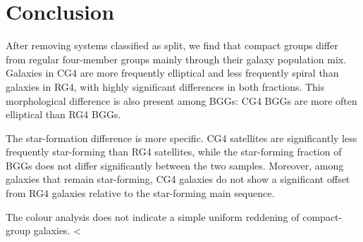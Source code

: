\documentclass{aa}
\begin{document}
\section{Conclusion}

After removing systems classified as split, we find that compact groups differ from regular four-member groups mainly through their galaxy population mix. Galaxies in CG4 are more frequently elliptical and less frequently spiral than galaxies in RG4, with highly significant differences in both fractions. This morphological difference is also present among BGGs: CG4 BGGs are more often elliptical than RG4 BGGs.

The star-formation difference is more specific. CG4 satellites are significantly less frequently star-forming than RG4 satellites, while the star-forming fraction of BGGs does not differ significantly between the two samples. Moreover, among galaxies that remain star-forming, CG4 galaxies do not show a significant offset from RG4 galaxies relative to the star-forming main sequence.

The colour analysis does not indicate a simple uniform reddening of compact-group galaxies. <%
\end{document}
